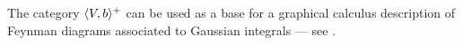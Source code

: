 The category $\langle V,b\rangle^+$ can be used as a base for a graphical
calculus description of Feynman diagrams associated to Gaussian
integrals --- see \cite[sec.\
2.8]{murri-fiorenza;feynman}.



